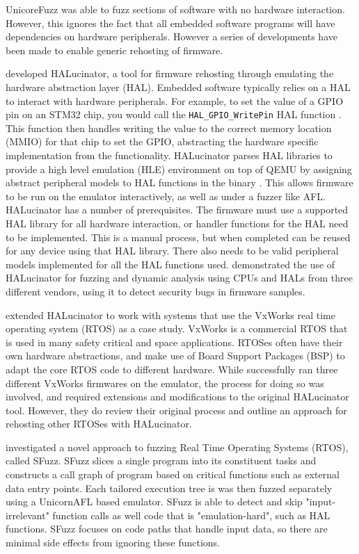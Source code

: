 \documentclass[../report.tex]{subfiles}
\begin{document}
UnicoreFuzz was able to fuzz sections of software with no hardware interaction.
However, this ignores the fact that all embedded software programs will have
dependencies on hardware peripherals. However a series of developments have
been made to enable generic rehosting of firmware.

\citet{HALucinator_2020} developed HALucinator, a tool for firmware rehosting
through emulating the hardware abstraction layer (HAL). Embedded software
typically relies on a HAL to interact with hardware peripherals. For example,
to set the value of a GPIO pin on an STM32 chip, you would call the
\lstinline{HAL_GPIO_WritePin} HAL function \citep{stm32hal}. This function then
handles writing the value to the correct memory location (MMIO) for that chip
to set the GPIO, abstracting the hardware specific implementation from the
functionality. HALucinator parses HAL libraries to provide a high level
emulation (HLE) environment on top of QEMU by assigning abstract peripheral
models to HAL functions in the binary \citep{HALucinator_2020}. This allows
firmware to be run on the emulator interactively, as well as under a fuzzer
like AFL. HALucinator has a number of prerequisites. The firmware must use a
supported HAL library for all hardware interaction, or handler functions for
the HAL need to be implemented. This is a manual process, but when completed
can be reused for any device using that HAL library. There also needs to be
valid peripheral models implemented for all the HAL functions used.
\citet{HALucinator_2020} demonstrated the use of HALucinator for fuzzing and
dynamic analysis using CPUs and HALs from three different vendors, using it to
detect security bugs in firmware samples.

\citet{Clements_2021} extended HALucinator to work with systems that use the
VxWorks real time operating system (RTOS) as a case study. VxWorks is a
commercial RTOS that is used in many safety critical and space applications.
RTOSes often have their own hardware abstractions, and make use of Board
Support Packages (BSP) to adapt the core RTOS code to different hardware.
While \citet{Clements_2021} successfully ran three different VxWorks firmwares
on the emulator, the process for doing so was involved, and required extensions
and modifications to the original HALucinator tool. However, they do review
their original process and outline an approach for rehosting other RTOSes with
HALucinator.

\citet{Chen_2022} investigated a novel approach to fuzzing Real Time Operating
Systems (RTOS), called SFuzz. SFuzz slices a single program into its
constituent tasks and constructs a call graph of program based on critical
functions such as external data entry points. Each tailored execution tree is
was then fuzzed separately using a UnicornAFL based emulator. SFuzz is able to
detect and skip "input-irrelevant" function calls as well code that is
"emulation-hard", such as HAL functions. SFuzz focuses on code paths that
handle input data, so there are minimal side effects from ignoring these
functions.
\end{document}

